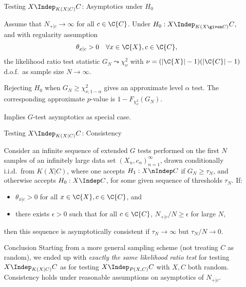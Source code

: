 \begin{frame}{Testing $X \Indep_{K(X|C)} C$: Asymptotics under $H_0$}
\begin{Prp}[\ref{prp:ext_G_test_asymptotics_H0}]
Assume that $N_{+|c} \to \infty$ for all $c \in \C{C}$.
Under $H_0 : X \Indep_{K(X \given C)} C$, and with regularity assumption
$$\theta_{x|c} > 0 \quad\forall x \in \C{X}, c \in \C{C},$$
the likelihood ratio test statistic $G_N \leadsto \chi_\nu^2$ 
with $\nu = (|\C{X}| - 1)(|\C{C}| - 1)$ d.o.f.\ as sample size $N \to \infty$.
\end{Prp}
\begin{Cor}
  Rejecting $H_0$ when $G_N \ge \chi_{\nu,1-\alpha}^2$ gives an approximate level $\alpha$ test.
  The corresponding approximate $p$-value is $1-F_{\chi^2_\nu}(G_N)$.
\end{Cor}
Implies $G$-test asymptotics as special case. 

\end{frame}

\begin{frame}{Testing $X \Indep_{K(X|C)} C$: Consistency}
  \begin{Cor}[\ref{cor:ext_G_test_consistency}]
  Consider an infinite sequence of extended $G$ tests performed on the first $N$ samples of an infinitely large
  data set $(X_n,c_n)_{n=1}^\infty$, drawn conditionally i.i.d.\ from $K(X|C)$,
  where one accepts $H_1 : X \nIndep C$ if $G_N \ge \tau_N$, and otherwise accepts $H_0 : X \Indep C$,
  for some given sequence of thresholds $\tau_N$.
  If:
    \begin{itemize}
      \item $\theta_{x|c} > 0$ for all $x \in \C{X}, c \in \C{C}$, and
      \item there exists $\epsilon > 0$ such that for all $c \in \C{C}$, $N_{+|c} / N \ge \epsilon$ for large $N$,
    \end{itemize}
  then this sequence is asymptotically consistent if $\tau_N \to \infty$ but $\tau_N / N \to 0$.
  \end{Cor}
\begin{block}{Conclusion}
  Starting from a more general sampling scheme (not treating $C$ as random), we ended up with \emph{exactly the same likelihood ratio test} for testing $X \Indep_{K(X|C)} C$ as for testing $X \Indep_{P(X,C)} C$ with $X,C$ both random. 
  Consistency holds under reasonable assumptions on asymptotics of $N_{+|c}$.
\end{block}
\end{frame}

